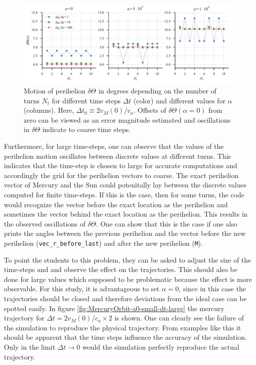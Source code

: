\documentclass[12pt,ngerman,american]{iopart}
\newcommand{\code}[1]{{\scriptsize\colorbox{light-gray}{\texttt{#1}}}}
\begin{document}
\begin{figure}[htb]
	\centering
	\includegraphics[width=.99\textwidth]{figs/angular-variaton.pdf}
	\caption{\label{fcc3}Motion of perihelion $\delta\Theta$ in degrees depending on the number of turns $N_t$ for different time steps $\Delta t$ (color) and different values for $\alpha$ (columns).
	Here, $\Delta t_0 \equiv 2 v_M(0)/c_a$.
	Offsets of $\delta \Theta(\alpha=0)$ from zero can be viewed as an error magnitude estimated and oscillations in $\delta \Theta$ indicate to coarse time steps.
}
\end{figure}

Furthermore, for large time-steps, one can observe that the values of the perihelion motion oscillates between discrete values at different turns.
This indicates that the time-step is chosen to large for accurate computations and accordingly the grid for the perihelion vectors to coarse.
The exact perihelion vector of Mercury and the Sun could potenitally lay between the discrete values computed for finite time-steps.
If this is the case, then for some turns, the code would recognize the vector before the exact location as the perihelion and sometimes the vector behind the exact location as the perihelion.
This results in the observed oscillations of $\delta \Theta$.
One can show that this is the case if one also prints the angles between the previous perihelion and the vector before the new perihelion (\code{vec\_r\_before\_last}) and after the new perihelion (\code{M}).

To point the students to this problem, they can be asked to adjust the size of the time-steps and and observe the effect on the trajectories.
This should also be done for large values which supposed to be problematic because the effect is more observable.
For this study, it is advantageous to set $\alpha =0$, since in this case the trajectories should be closed and therefore deviations from the ideal case can be spotted easily.
In figure \ref{fig:MercuryOrbit-a0-small-dt-large} the mercury trajectory for $\Delta t=2 v_M(0) / c_a \times 2$ is shown.
One can clearly see the failure of the simulation to reproduce the physical trajectory.
From examples like this it should be apparent that the time steps influence the accuracy of the simulation.
Only in the limit $\Delta t \rightarrow 0$ would the simulation perfectly reproduce the actual trajectory.
\end{document}

